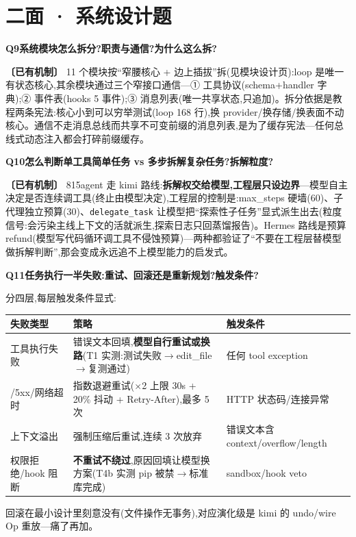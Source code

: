 \documentclass[10pt,a4paper]{article}
\renewcommand{\small}{\fontsize{8}{11.5}\selectfont}
\newcommand{\taghave}{\textcolor{okc}{\textbf{〔已有机制〕}}}
\newcommand{\qhead}[2]{\par\vspace{7pt}\noindent
  \colorbox{acc}{\color{white}\bfseries\small #1}\hspace{4pt}\textbf{#2}\par\vspace{2pt}}
\newenvironment{qa}[2]{\qhead{#1}{#2}\small}{\par\vspace{2pt}}
\begin{document}
\section{二面 · 系统设计题}

\begin{qa}{Q9}{系统模块怎么拆分?职责与通信?为什么这么拆?}
\taghave{} 11 个模块按``窄腰核心 + 边上插拔''拆(见模块设计页):loop 是唯一有状态核心,其余模块通过三个窄接口通信---① 工具协议(schema+handler 字典);② 事件表(hooks 5 事件);③ 消息列表(唯一共享状态,只追加)。拆分依据是教程两条宪法:核心小到可以穷举测试(loop 168 行),换 provider/换存储/换表面不动核心。通信不走消息总线而共享不可变前缀的消息列表,是为了缓存宪法---任何总线式动态注入都会打碎前缀缓存。
\end{qa}

\begin{qa}{Q10}{怎么判断单工具简单任务 vs 多步拆解复杂任务?拆解粒度?}
\taghave{} 815agent 走 kimi 路线:\textbf{拆解权交给模型,工程层只设边界}---模型自主决定是否连续调工具(终止由模型决定),工程层的控制是:max\_steps 硬墙(60)、子代理独立预算(30)、\texttt{delegate\_task} 让模型把``探索性子任务''显式派生出去(粒度信号:会污染主线上下文的活就派生,探索日志只回蒸馏报告)。Hermes 路线是预算 refund(模型写代码循环调工具不侵蚀预算)---两种都验证了``不要在工程层替模型做拆解判断'',那会变成永远追不上模型能力的启发式。
\end{qa}

\begin{qa}{Q11}{任务执行一半失败:重试、回滚还是重新规划?触发条件?}
分四层,每层触发条件显式:

{\small
\begin{longtable}{|>{\raggedright\arraybackslash}p{}|>{\raggedright\arraybackslash}p{}|>{\raggedright\arraybackslash}p{}|}
\hline
\rowcolor{headc}\textbf{失败类型} & \textbf{策略} & \textbf{触发条件}\\\hline
\endhead
工具执行失败 & 错误文本回填,\textbf{模型自行重试或换路}(T1 实测:测试失败$\to$edit\_file$\to$复测通过) & 任何 tool exception\\\hline
429/5xx/网络超时 & 指数退避重试($\times$2 上限 30s + 20\% 抖动 + Retry-After),最多 5 次 & HTTP 状态码/连接异常\\\hline
上下文溢出 & 强制压缩后重试,连续 3 次放弃 & 错误文本含 context/overflow/length\\\hline
权限拒绝/hook 阻断 & \textbf{不重试不绕过},原因回填让模型换方案(T4b 实测 pip 被禁$\to$标准库完成) & sandbox/hook veto\\\hline
\end{longtable}}

回滚在最小设计里刻意没有(文件操作无事务),对应演化级是 kimi 的 undo/wire Op 重放---痛了再加。
\end{qa}
\end{document}
